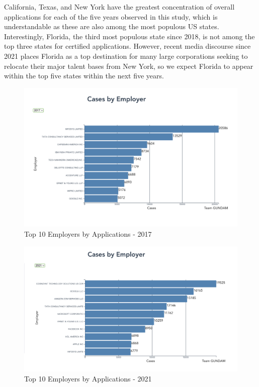 \documentclass[sigconf]{acmart}
\begin{document}
California, Texas, and New York have the greatest concentration of overall applications 
for each of the five years observed in this study, which is understandable as 
these are also among the most populous US states. 
Interestingly, Florida, the third most populous state since 2018, is not among the 
top three states for certified applications. However, recent media discourse since 2021 
places Florida as a top destination for many large corporations seeking to relocate their major 
talent bases from New York, so we expect Florida to appear within the top five states within 
the next five years. 

\begin{figure}
  \includegraphics[width=\linewidth]{employer2017.png}
  \caption{Top 10 Employers by Applications - 2017}
  \label{fig:employer2017}
\end{figure}

\begin{figure}
  \includegraphics[width=\linewidth]{employer2021.png}
  \caption{Top 10 Employers by Applications - 2021}
  \label{fig:employer2021}
\end{figure}
\end{document}
